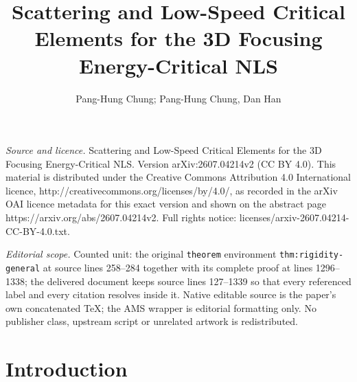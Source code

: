 \documentclass[10pt,a4paper]{amsart}
\numberwithin{equation}{section}
\begin{document}
\title[Scattering and Low-Speed Critical Elements for the 3D Focusi]{Scattering and Low-Speed Critical Elements for the 3D Focusing Energy-Critical NLS}
\author{Pang-Hung Chung; Pang-Hung Chung, Dan Han}
\date{}
\maketitle
\noindent\emph{Source and licence.} Scattering and Low-Speed Critical Elements for the 3D Focusing Energy-Critical NLS. Version arXiv:2607.04214v2 (CC BY 4.0). This material is distributed under the Creative Commons Attribution 4.0 International licence, http://creativecommons.org/licenses/by/4.0/, as recorded in the arXiv OAI licence metadata for this exact version and shown on the abstract page https://arxiv.org/abs/2607.04214v2. Full rights notice: licenses/arxiv-2607.04214-CC-BY-4.0.txt.\par\smallskip
\noindent\textit{Editorial scope.} Counted unit: the original \texttt{theorem} environment \texttt{thm:rigidity-general} at source lines 258--284 together with its complete proof at lines 1296--1338; the delivered document keeps source lines 127--1339 so that every referenced label and every citation resolves inside it. Native editable source is the paper's own concatenated TeX; the AMS wrapper is editorial formatting only. No publisher class, upstream script or unrelated artwork is redistributed.
\section{Introduction}
\end{document}
